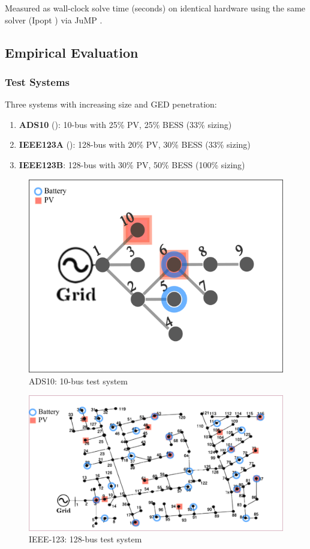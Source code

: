 Measured as wall-clock solve time (seconds) on identical hardware using the same solver (Ipopt \cite{ipopt-solver-Wachter2006Mar}) via JuMP \cite{Lubin2023}.

\subsection{Empirical Evaluation}

\subsubsection{Test Systems}

Three systems with increasing size and GED penetration:

\begin{enumerate}
    \item \textbf{ADS10} (): 10-bus with 25\% PV, 25\% BESS (33\% sizing)
    \item \textbf{IEEE123A} (): 128-bus with 20\% PV, 30\% BESS (33\% sizing)
    \item \textbf{IEEE123B}: 128-bus with 30\% PV, 50\% BESS (100\% sizing)
\end{enumerate}

\begin{figure}[h]
    \centering
    \includegraphics[width=0.6\linewidth]{figures/ads10-pv25-batt25.png}
    \caption{ADS10: 10-bus test system}
    \label{fig:mpopf-tradeoffs-ads10}
\end{figure}

\begin{figure}[h]
    \centering
    \includegraphics[width=0.85\linewidth]{figures/ieee123-pv20-batt30.png}
    \caption{IEEE-123: 128-bus test system}
    \label{fig:mpopf-tradeoffs-ieee123}
\end{figure}

